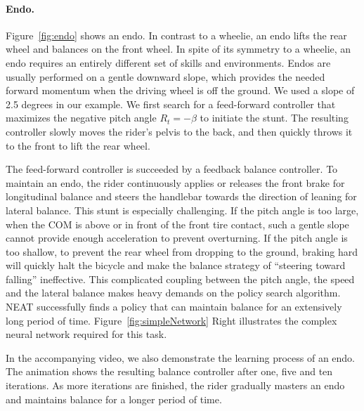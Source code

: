 \paragraph{Endo.} Figure~\ref{fig:endo} shows an endo. In contrast to a wheelie, an endo lifts the rear wheel and balances on the front wheel. In spite of its symmetry to a wheelie, an endo requires an entirely different set of skills and environments. Endos are usually performed on a gentle downward slope, which provides the needed forward momentum when the driving wheel is off the ground. We used a slope of 2.5 degrees in our example. We first search for a feed-forward controller that maximizes the negative pitch angle $R_t = -\beta$ to initiate the stunt. The resulting controller slowly moves the rider's pelvis to the back, and then quickly throws it to the front to lift the rear wheel.

The feed-forward controller is succeeded by a feedback balance controller. To maintain an endo, the rider continuously applies or releases the front brake for longitudinal balance and steers the handlebar towards the direction of leaning for lateral balance. This stunt is especially challenging. If the pitch angle is too large, when the COM is above or in front of the front tire contact, such a gentle slope cannot provide enough acceleration to prevent overturning. If the pitch angle is too shallow, to prevent the rear wheel from dropping to the ground, braking hard will quickly halt the bicycle and make the balance strategy of ``steering toward falling'' ineffective. This complicated coupling between the pitch angle, the speed and the lateral balance makes heavy demands on the policy search algorithm. NEAT successfully finds a policy that can maintain balance for an extensively long period of time. Figure~\ref{fig:simpleNetwork} Right illustrates the complex neural network required for this task.

In the accompanying video, we also demonstrate the learning process of an endo. The animation shows the resulting balance controller after one, five and ten iterations. As more iterations are finished, the rider gradually masters an endo and maintains balance for a longer period of time.

